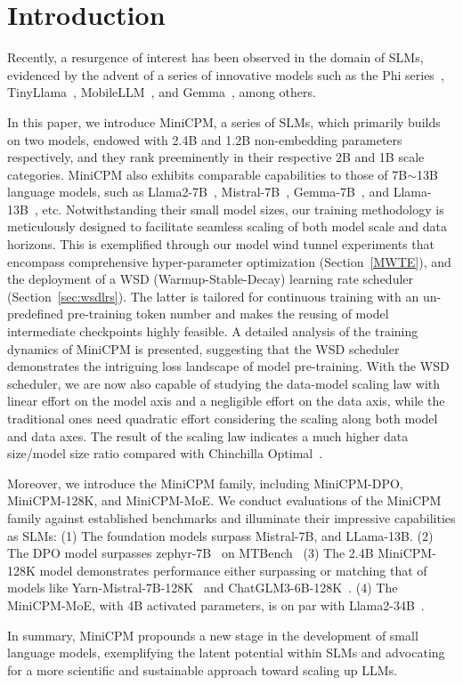 \section{Introduction}

Recently, a resurgence of interest has been observed in the domain of SLMs, evidenced by the advent of a series of innovative models such as the Phi series~\citep{gunasekar2023textbooks, li2023textbooks, Javaheripi2023Phi2}, TinyLlama~\citep{zhang2024tinyllama}, MobileLLM~\citep{liu2024mobilellm}, and Gemma~\citep{Banks2024Gemma}, among others.

In this paper, we introduce MiniCPM, a series of SLMs, which primarily builds on two models, endowed with 2.4B and 1.2B non-embedding parameters respectively, and they rank preeminently in their respective 2B and 1B scale categories. MiniCPM also exhibits comparable capabilities to those of 7B$\sim$13B language models, such as Llama2-7B~\citep{touvron2023llama}, Mistral-7B~\citep{jiang2023mistral}, Gemma-7B~\citep{Banks2024Gemma}, and Llama-13B~\citep{touvron2023llama}, etc.  Notwithstanding their small model sizes, our training methodology is meticulously designed to facilitate seamless scaling of both model scale and data horizons. This is exemplified through our model wind tunnel experiments that encompass comprehensive hyper-parameter optimization (Section~\ref{MWTE}), and the deployment of a WSD (Warmup-Stable-Decay) learning rate scheduler (Section~\ref{sec:wsdlrs}). The latter is tailored for continuous training with an un-predefined pre-training token number and makes the reusing of model intermediate checkpoints highly feasible. A detailed analysis of the training dynamics of MiniCPM is presented, suggesting that the WSD scheduler demonstrates the intriguing loss landscape of model pre-training. With the WSD scheduler, we are now also capable of studying the data-model scaling law with linear effort on the model axis and a negligible effort on the data axis, while the traditional ones need quadratic effort considering the scaling along both model and data axes. The result of the scaling law indicates a much higher data size/model size ratio compared with Chinchilla Optimal~\citep{hoffmann2022training}.

Moreover, we introduce the MiniCPM family, including MiniCPM-DPO, MiniCPM-128K, and MiniCPM-MoE. We conduct evaluations of the MiniCPM family against established benchmarks and illuminate their impressive capabilities as SLMs: (1) The foundation models surpass Mistral-7B, and LLama-13B. (2) The DPO model surpasses zephyr-7B~\citep{tunstall2023zephyr} on MTBench~\citep{zheng2024judging} (3) The 2.4B MiniCPM-128K model demonstrates performance either surpassing or matching that of models like Yarn-Mistral-7B-128K~\citep{peng2023yarn} and ChatGLM3-6B-128K~\citep{du2021glm}. (4) The MiniCPM-MoE, with 4B activated parameters, is on par with Llama2-34B~\citep{touvron2023llama}.

In summary, MiniCPM propounds a new stage in the development of small language models, exemplifying the latent potential within SLMs and advocating for a more scientific and sustainable approach toward scaling up LLMs. 











